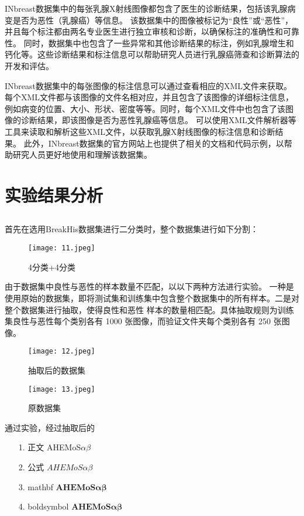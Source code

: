 \documentclass[AutoFakeBold]{LZUThesis}
\begin{document}
INbreast数据集中的每张乳腺X射线图像都包含了医生的诊断结果，包括该乳腺病变是否为恶性（乳腺癌）等信息。
该数据集中的图像被标记为“良性”或“恶性”，并且每个标注都由两名专业医生进行独立审核和诊断，以确保标注的准确性和可靠性。
同时，数据集中也包含了一些异常和其他诊断结果的标注，例如乳腺增生和钙化等。这些诊断结果和标注信息可以帮助研究人员进行乳腺癌筛查和诊断算法的开发和评估。

INbreast数据集中的每张图像的标注信息可以通过查看相应的XML文件来获取。
每个XML文件都与该图像的文件名相对应，并且包含了该图像的详细标注信息，例如病变的位置、大小、形状、密度等等。同时，每个XML文件中也包含了该图像的诊断结果，即该图像是否为恶性乳腺癌等信息。
可以使用XML文件解析器等工具来读取和解析这些XML文件，以获取乳腺X射线图像的标注信息和诊断结果。
此外，INbreast数据集的官方网站上也提供了相关的文档和代码示例，以帮助研究人员更好地使用和理解该数据集。




\section{实验结果分析}
\subsection{}
首先在选用BreakHis数据集进行二分类时，整个数据集进行如下分割：
\begin{figure}[H]
    \centering
    \texttt{[image: 11.jpeg]}
    \caption{4分类+4分类}
    \label{figure}
 \end{figure}

由于数据集中良性与恶性的样本数量不匹配，以以下两种方法进行实验。
一种是使用原始的数据集，即将测试集和训练集中包含整个数据集中的所有样本。二是对整个数据集进行抽取，使得良性和恶性
样本的数量相匹配。具体抽取规则为训练集良性与恶性每个类别各有 1000 张图像，而验证文件夹每个类别各有 250 张图像。

\begin{figure}[H]
    \centering
    \texttt{[image: 12.jpeg]}
    \caption{抽取后的数据集}
    \label{figure}
 \end{figure}


 \begin{figure}[H]
    \centering
    \texttt{[image: 13.jpeg]}
    \caption{原数据集}
    \label{figure}
 \end{figure}

通过实验，经过抽取后的


\begin{itemize}
  \item [1. 正文] AHEMoS$\alpha \beta$
  \item[2. 公式]  $AHEMoS \alpha \beta$
  \item[3. mathbf] $\mathbf{AHEMoS\alpha \beta}$
  \item [4. boldsymbol] $\boldsymbol{AHEMoS\alpha \beta}$
\end{itemize}
\end{document}
